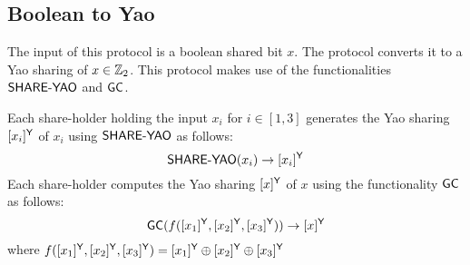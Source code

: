 \subsection{Boolean to Yao}
\begin{algorithm}[H]
\renewcommand{\thealgorithm}{}
\caption{$[x]^\Boolean \rightarrow [x]^\Yao$}
\label{protocol1}
The input of this protocol is a boolean shared bit $x$. The protocol converts it to a Yao sharing of $x \in \mathbb{Z}_2$. This protocol makes use of the functionalities $\mathsf{SHARE\mbox{-}YAO}$ and $\mathsf{GC}$.
\smallskip
\begin{algorithmic}[1]
\STATE Each share-holder holding the input $x_i$ for $i \in [1, 3]$ generates the Yao sharing $[x_i]^{\mathsf{Y}}$ of $x_i$ using $\mathsf{SHARE\mbox{-}YAO}$ as follows:
\begin{equation*}
    \mathsf{SHARE\mbox{-}YAO}(x_i) \rightarrow [x_i]^{\mathsf{Y}}
\end{equation*}
\STATE Each share-holder computes the Yao sharing $[x]^{\mathsf{Y}}$ of $x$ using the functionality $\mathsf{GC}$ as follows:
\begin{equation*}
    \mathsf{GC}(f([x_1]^{\mathsf{Y}}, [x_2]^{\mathsf{Y}}, [x_3]^{\mathsf{Y}})) \rightarrow [x]^{\mathsf{Y}}
\end{equation*}
where $f([x_1]^{\mathsf{Y}}, [x_2]^{\mathsf{Y}}, [x_3]^{\mathsf{Y}}) = [x_1]^{\mathsf{Y}} \oplus [x_2]^{\mathsf{Y}} \oplus [x_3]^{\mathsf{Y}}$
\end{algorithmic}
\end{algorithm}


